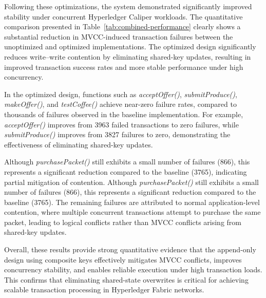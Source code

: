 \documentclass[12pt]{article}
\begin{document}
	Following these optimizations, the system demonstrated significantly improved stability under concurrent Hyperledger Caliper workloads. The quantitative comparison presented in Table~\ref{tab:combined-performance} clearly shows a substantial reduction in MVCC-induced transaction failures between the unoptimized and optimized implementations. The optimized design significantly reduces write–write contention by eliminating shared-key updates, resulting in improved transaction success rates and more stable performance under high concurrency.
	
	In the optimized design, functions such as \textit{acceptOffer()}, 
	\textit{submitProduce()}, \textit{makeOffer()}, and \textit{testCoffee()} 
	achieve near-zero failure rates, compared to thousands of failures observed 
	in the baseline implementation. For example, \textit{acceptOffer()} improves 
	from 3963 failed transactions to zero failures, while \textit{submitProduce()} 
	improves from 3827 failures to zero, demonstrating the effectiveness of 
	eliminating shared-key updates.
	
	Although \textit{purchasePacket()} still exhibits a small number of failures 
	(866), this represents a significant reduction compared to the baseline (3765), 
	indicating partial mitigation of contention. Although \textit{purchasePacket()} still exhibits a small number of failures 
	(866), this represents a significant reduction compared to the baseline (3765). 
	The remaining failures are attributed to normal application-level contention, 
	where multiple concurrent transactions attempt to purchase the same packet, 
	leading to logical conflicts rather than MVCC conflicts arising from shared-key updates.
	
	Overall, these results provide strong quantitative evidence that the append-only 
	design using composite keys effectively mitigates MVCC conflicts, improves 
	concurrency stability, and enables reliable execution under high transaction loads. 
	This confirms that eliminating shared-state overwrites is critical for achieving 
	scalable transaction processing in Hyperledger Fabric networks.
	
	
\end{document}
